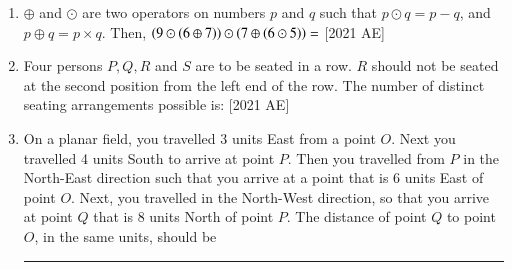 \documentclass[journal]{IEEEtran}
\begin{document}
\begin{enumerate}
\hfill [2021 AE]
\begin{enumerate}
\end{enumerate}
\item $\oplus$ and $\odot$ are two operators on numbers $p$ and $q$ such that $p \odot q = p - q$, and $p \oplus q = p \times q$. Then, $\left(9 \odot \left(6 \oplus 7\right)\right) \odot \left(7 \oplus \left(6 \odot 5\right)\right) = $ \hfill[2021 AE] 
\begin{enumerate}
\end{enumerate}
\item Four persons $P, Q, R$ and $S$ are to be seated in a row. $R$ should not be seated
at the second position from the left end of the row. The number of distinct
seating arrangements possible is: \hfill [2021 AE]
\begin{enumerate}
\end{enumerate}
\item On a planar field, you travelled 3 units East from a point $O$. Next you
travelled 4 units South to arrive at point $ P$. Then you travelled from $P$ in the
North-East direction such that you arrive at a point that is 6 units East of
point $O$. Next, you travelled in the North-West direction, so that you arrive
at point $Q$ that is 8 units North of point $P$.
The distance of point $ Q $ to point $ O$, in the same units, should be \rule{2cm}{0.4pt}


\end{enumerate}
\end{document}
